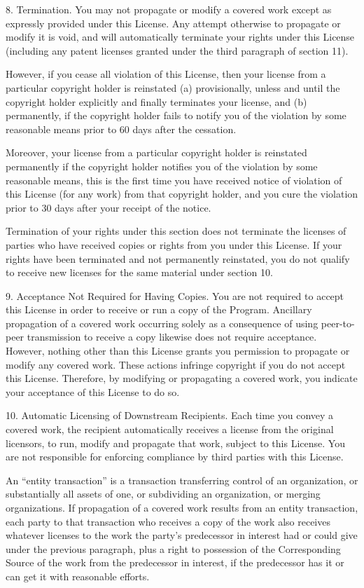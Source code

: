 8. Termination.
You may not propagate or modify a covered work except as expressly provided under this License. Any attempt otherwise to propagate or modify it is void, and will automatically terminate your rights under this License (including any patent licenses granted under the third paragraph of section 11).

However, if you cease all violation of this License, then your license from a particular copyright holder is reinstated (a) provisionally, unless and until the copyright holder explicitly and finally terminates your license, and (b) permanently, if the copyright holder fails to notify you of the violation by some reasonable means prior to 60 days after the cessation.

Moreover, your license from a particular copyright holder is reinstated permanently if the copyright holder notifies you of the violation by some reasonable means, this is the first time you have received notice of violation of this License (for any work) from that copyright holder, and you cure the violation prior to 30 days after your receipt of the notice.

Termination of your rights under this section does not terminate the licenses of parties who have received copies or rights from you under this License. If your rights have been terminated and not permanently reinstated, you do not qualify to receive new licenses for the same material under section 10.

9. Acceptance Not Required for Having Copies.
You are not required to accept this License in order to receive or run a copy of the Program. Ancillary propagation of a covered work occurring solely as a consequence of using peer-to-peer transmission to receive a copy likewise does not require acceptance. However, nothing other than this License grants you permission to propagate or modify any covered work. These actions infringe copyright if you do not accept this License. Therefore, by modifying or propagating a covered work, you indicate your acceptance of this License to do so.

10. Automatic Licensing of Downstream Recipients.
Each time you convey a covered work, the recipient automatically receives a license from the original licensors, to run, modify and propagate that work, subject to this License. You are not responsible for enforcing compliance by third parties with this License.

An “entity transaction” is a transaction transferring control of an organization, or substantially all assets of one, or subdividing an organization, or merging organizations. If propagation of a covered work results from an entity transaction, each party to that transaction who receives a copy of the work also receives whatever licenses to the work the party's predecessor in interest had or could give under the previous paragraph, plus a right to possession of the Corresponding Source of the work from the predecessor in interest, if the predecessor has it or can get it with reasonable efforts.

